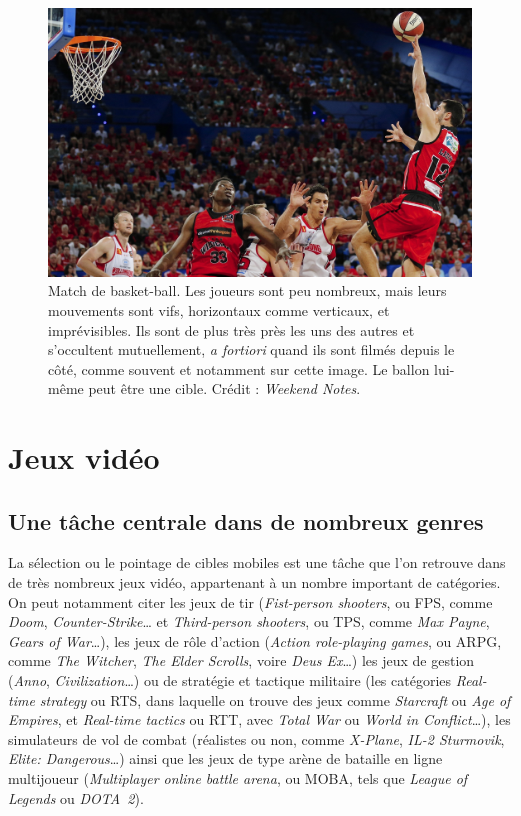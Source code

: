 	\begin{figure}[H]
		\centering
		\includegraphics[width=\textwidth]{figures/ch1/basket}
		\caption[Match de basket-ball.]{Match de basket-ball. Les joueurs sont peu nombreux, mais leurs mouvements sont vifs, horizontaux comme verticaux, et imprévisibles. Ils sont de plus très près les uns des autres et s'occultent mutuellement, \emph{a fortiori} quand ils sont filmés depuis le côté, comme souvent et notamment sur cette image. Le ballon lui-même peut être une cible. Crédit : \emph{Weekend Notes}\footnotemark.}
		\label{fig:basketball}
	\end{figure}
	
	
	\section{Jeux vidéo}
	\subsection{Une tâche centrale dans de nombreux genres}
	La sélection ou le pointage de cibles mobiles est une tâche que l'on retrouve dans de très nombreux jeux vidéo, appartenant à un nombre important de catégories. On peut notamment citer les jeux de tir (\emph{Fist-person shooters}, ou FPS, comme \emph{Doom}, \emph{Counter-Strike}\ldots{} et \emph{Third-person shooters}, ou TPS, comme \emph{Max Payne}, \emph{Gears of War}\ldots{}), les jeux de rôle d'action (\emph{Action role-playing games}, ou ARPG, comme \emph{The Witcher}, \emph{The Elder Scrolls}, voire \emph{Deus Ex}\ldots{}) les jeux de gestion (\emph{Anno}, \emph{Civilization}\ldots{}) ou de stratégie et tactique militaire (les catégories \emph{Real-time strategy} ou RTS, dans laquelle on trouve des jeux comme \emph{Starcraft} ou \emph{Age of Empires}, et \emph{Real-time tactics} ou RTT, avec \emph{Total War} ou \emph{World in Conflict}\ldots{}), les simulateurs de vol de combat (réalistes ou non, comme \emph{X-Plane}, \emph{IL-2 Sturmovik}, \emph{Elite: Dangerous}\ldots{}) ainsi que les jeux de type arène de bataille en ligne multijoueur (\emph{Multiplayer online battle arena}, ou MOBA, tels que \emph{League of Legends} ou \emph{DOTA~2}).
	
